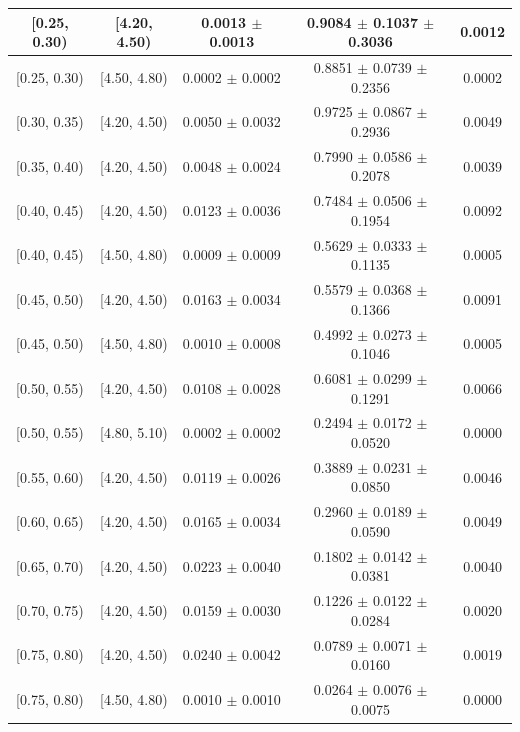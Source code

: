 \begin{longtable}{|c|c|c|c|c|}
\hline
\endlastfoot
[0.25, 0.30) & [4.20, 4.50) & 0.0013 $\pm$ 0.0013 & 0.9084 $\pm$ 0.1037 $\pm$ 0.3036 & 0.0012 \\ 
\hline
[0.25, 0.30) & [4.50, 4.80) & 0.0002 $\pm$ 0.0002 & 0.8851 $\pm$ 0.0739 $\pm$ 0.2356 & 0.0002 \\ 
\hline
[0.30, 0.35) & [4.20, 4.50) & 0.0050 $\pm$ 0.0032 & 0.9725 $\pm$ 0.0867 $\pm$ 0.2936 & 0.0049 \\ 
\hline
[0.35, 0.40) & [4.20, 4.50) & 0.0048 $\pm$ 0.0024 & 0.7990 $\pm$ 0.0586 $\pm$ 0.2078 & 0.0039 \\ 
\hline
[0.40, 0.45) & [4.20, 4.50) & 0.0123 $\pm$ 0.0036 & 0.7484 $\pm$ 0.0506 $\pm$ 0.1954 & 0.0092 \\ 
\hline
[0.40, 0.45) & [4.50, 4.80) & 0.0009 $\pm$ 0.0009 & 0.5629 $\pm$ 0.0333 $\pm$ 0.1135 & 0.0005 \\ 
\hline
[0.45, 0.50) & [4.20, 4.50) & 0.0163 $\pm$ 0.0034 & 0.5579 $\pm$ 0.0368 $\pm$ 0.1366 & 0.0091 \\ 
\hline
[0.45, 0.50) & [4.50, 4.80) & 0.0010 $\pm$ 0.0008 & 0.4992 $\pm$ 0.0273 $\pm$ 0.1046 & 0.0005 \\ 
\hline
[0.50, 0.55) & [4.20, 4.50) & 0.0108 $\pm$ 0.0028 & 0.6081 $\pm$ 0.0299 $\pm$ 0.1291 & 0.0066 \\ 
\hline
[0.50, 0.55) & [4.80, 5.10) & 0.0002 $\pm$ 0.0002 & 0.2494 $\pm$ 0.0172 $\pm$ 0.0520 & 0.0000 \\ 
\hline
[0.55, 0.60) & [4.20, 4.50) & 0.0119 $\pm$ 0.0026 & 0.3889 $\pm$ 0.0231 $\pm$ 0.0850 & 0.0046 \\ 
\hline
[0.60, 0.65) & [4.20, 4.50) & 0.0165 $\pm$ 0.0034 & 0.2960 $\pm$ 0.0189 $\pm$ 0.0590 & 0.0049 \\ 
\hline
[0.65, 0.70) & [4.20, 4.50) & 0.0223 $\pm$ 0.0040 & 0.1802 $\pm$ 0.0142 $\pm$ 0.0381 & 0.0040 \\ 
\hline
[0.70, 0.75) & [4.20, 4.50) & 0.0159 $\pm$ 0.0030 & 0.1226 $\pm$ 0.0122 $\pm$ 0.0284 & 0.0020 \\ 
\hline
[0.75, 0.80) & [4.20, 4.50) & 0.0240 $\pm$ 0.0042 & 0.0789 $\pm$ 0.0071 $\pm$ 0.0160 & 0.0019 \\ 
\hline
[0.75, 0.80) & [4.50, 4.80) & 0.0010 $\pm$ 0.0010 & 0.0264 $\pm$ 0.0076 $\pm$ 0.0075 & 0.0000 \\ 
\hline
\end{longtable}
